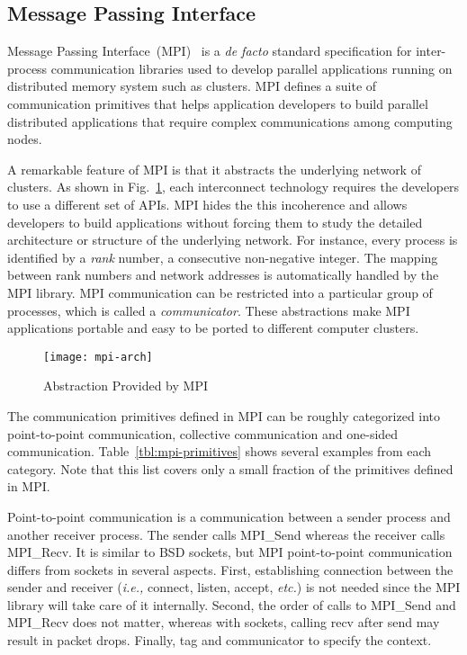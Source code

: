 \subsection{Message Passing Interface}\label{sec:i-mpi}

Message Passing Interface~(MPI)~\autocite{MessagePassingInterfaceForum2015} is
a \emph{de facto} standard specification for inter-process communication
libraries used to develop parallel applications running on distributed memory
system such as clusters. MPI defines a suite of communication primitives that
helps application developers to build parallel distributed applications that
require complex communications among computing nodes.

A remarkable feature of MPI is that it abstracts the underlying network
of clusters. As shown in Fig.~\ref{fig:mpi-arch}, each interconnect technology
requires the developers to use a different set of APIs. MPI hides the this
incoherence and allows developers to build applications without forcing them
to study the detailed architecture or structure of the underlying network. For
instance, every process is identified by a \emph{rank} number, a consecutive
non-negative integer. The mapping between rank numbers and network addresses
is automatically handled by the MPI library. MPI communication can be
restricted into a particular group of processes, which is called a
\emph{communicator}. These abstractions make MPI applications portable and
easy to be ported to different computer clusters.

\begin{figure}
    \centering
    \texttt{[image: mpi-arch]}
    \caption{Abstraction Provided by MPI}%
    \label{fig:mpi-arch}
\end{figure}

The communication primitives defined in MPI can be roughly categorized into
point-to-point communication, collective communication and one-sided
communication. Table~\ref{tbl:mpi-primitives} shows several examples from each
category. Note that this list covers only a small fraction of the primitives
defined in MPI\@.

Point-to-point communication is a communication between a sender process and
another receiver process. The sender calls MPI\_Send whereas the
receiver calls MPI\_Recv. It is similar to BSD sockets, but MPI point-to-point
communication differs from sockets in several aspects. First, establishing
connection between the sender and receiver (\emph{i.e.,} connect, listen,
accept, \emph{etc.}) is not needed since the MPI library will take care of it
internally. Second, the order of calls to MPI\_Send and MPI\_Recv does not
matter, whereas with sockets, calling recv after send may result in packet
drops. Finally, tag and communicator to specify the context.

